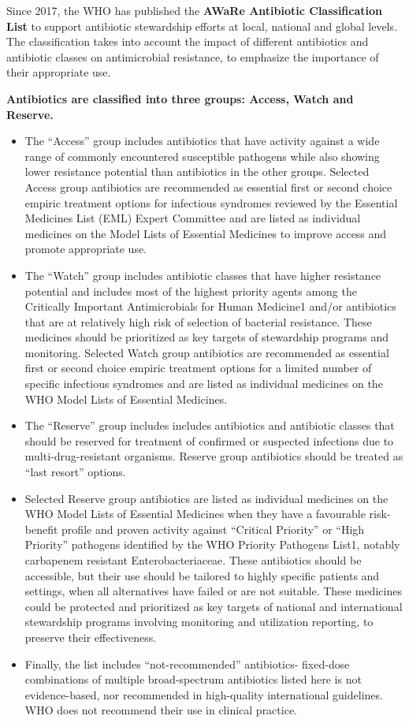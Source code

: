 \documentclass[
]{book}
\providecommand{\tightlist}{%
  \setlength{\itemsep}{0pt}\setlength{\parskip}{0pt}}
\begin{document}
Since 2017, the WHO has published the \textbf{AWaRe Antibiotic Classification List} to support antibiotic stewardship efforts at local, national and global levels. The classification takes into account the impact of different antibiotics and antibiotic classes on antimicrobial resistance, to emphasize the importance of their appropriate use.

\textbf{Antibiotics are classified into three groups: Access, Watch and Reserve.}

\begin{itemize}
\tightlist
\item
  The ``Access'' group includes antibiotics that have activity against a wide range of commonly encountered susceptible pathogens while also showing lower resistance potential than antibiotics in the other groups. Selected Access group antibiotics are recommended as essential first or second choice empiric treatment options for infectious syndromes reviewed by the Essential Medicines List (EML) Expert Committee and are listed as individual medicines on the Model Lists of Essential Medicines to improve access and promote appropriate use.
\item
  The ``Watch'' group includes antibiotic classes that have higher resistance potential and includes most of the highest priority agents among the Critically Important Antimicrobials for Human Medicine1 and/or antibiotics that are at relatively high risk of selection of bacterial resistance. These medicines should be prioritized as key targets of stewardship programs and monitoring. Selected Watch group antibiotics are recommended as essential first or second choice empiric treatment options for a limited number of specific infectious syndromes and are listed as individual medicines on the WHO Model Lists of Essential Medicines.
\item
  The ``Reserve'' group includes includes antibiotics and antibiotic classes that should be reserved for treatment of confirmed or suspected infections due to multi-drug-resistant organisms. Reserve group antibiotics should be treated as ``last resort'' options.
\item
  Selected Reserve group antibiotics are listed as individual medicines on the WHO Model Lists of Essential Medicines when they have a favourable risk-benefit profile and proven activity against ``Critical Priority'' or ``High Priority'' pathogens identified by the WHO Priority Pathogens List1, notably carbapenem resistant Enterobacteriaceae. These antibiotics should be accessible, but their use should be tailored to highly specific patients and settings, when all alternatives have failed or are not suitable. These medicines could be protected and prioritized as key targets of national and international stewardship programs involving monitoring and utilization reporting, to preserve their effectiveness.
\item
  Finally, the list includes ``not-recommended'' antibiotics- fixed-dose combinations of multiple broad-spectrum antibiotics listed here is not evidence-based, nor recommended in high-quality international guidelines. WHO does not recommend their use in clinical practice.
\end{itemize}
\end{document}
